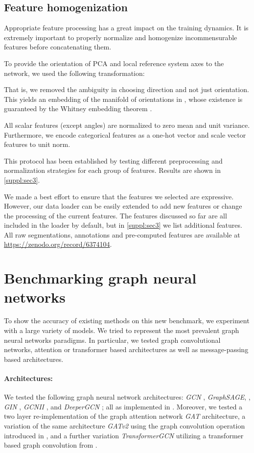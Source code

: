 \documentclass[10pt,twocolumn,letterpaper]{article}
\begin{document}
\subsection{Feature homogenization} 
Appropriate feature processing has a great impact on the training dynamics. It is extremely important to properly normalize and homogenize incommensurable features before concatenating them.

To provide the orientation of PCA and local reference system axes to the network, we used the following transformation: 

That is, we removed the ambiguity in choosing direction and not just orientation. This yields an embedding of the manifold of orientations  in , whose existence is guaranteed by the Whitney embedding theorem \cite{whitney1944self, adachi2012embeddings}.

All scalar features (except angles) are normalized to zero mean and unit variance. Furthermore, we encode categorical features as a one-hot vector and scale vector features to unit norm.

This protocol has been established by testing different preprocessing and normalization strategies for each group of features. Results are shown in \cref{suppl:sec3}.

We made a best effort to ensure that the features we selected are expressive. However, our data loader can be easily extended to add new features or change the processing of the current features. The features discussed so far are all included in the loader by default, but in \cref{suppl:sec3} we list additional features. All raw segmentations, annotations and pre-computed features are available at \url{https://zenodo.org/record/6374104}.

\section{Benchmarking graph neural networks}
\label{sec:baseline}
To show the accuracy of existing methods on this new benchmark, we experiment with a large variety of models. We tried to represent the most prevalent graph neural networks paradigms. In particular, we tested graph convolutional networks, attention or transformer based architectures as well as message-passing based architectures.

\paragraph{Architectures:} We tested the following graph neural network architectures: \textit{GCN} \cite{kipf2016semi}, \textit{GraphSAGE}, \cite{hamilton2017inductive}, \textit{GIN} \cite{xu2018powerful}, \textit{GCNII} \cite{chen2020simple}, and \textit{DeeperGCN} \cite{li2019deepgcns, li2020deepergcn}; all as implemented in \cite{Fey2019}. Moreover, we tested a two layer re-implementation of the graph attention network \textit{GAT} \cite{velickovic2018graph} architecture, a variation of the same architecture \textit{GATv2} using the graph convolution operation introduced in \cite{brody2021attentive}, and a further variation \textit{TransformerGCN} utilizing a transformer \cite{vaswani2017attention} based graph convolution from \cite{shi2020masked}. 
\end{document}
